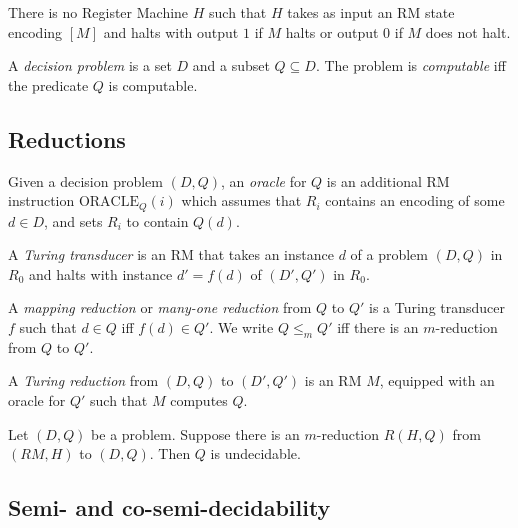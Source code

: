 \documentclass{article}
\begin{document}
\begin{theorem}[Notes I.8]
	There is no Register Machine $H$ such that $H$ takes as input an RM state encoding
	$[M]$ and halts with output $1$ if $M$ halts or output $0$ if $M$ does not halt.
\end{theorem}


\begin{definition}
	A \emph{decision problem} is a set $D$ and a subset $Q\subseteq D$.
	The problem is \emph{computable} iff the predicate $Q$ is computable.
\end{definition}

\subsection{Reductions}

\begin{definition}
	Given a decision problem $(D,Q)$, an \emph{oracle} for $Q$ is an additional
	RM instruction $\text{ORACLE}_Q(i)$ which assumes that $R_i$ contains an
	encoding of some $d\in D$, and sets $R_i$ to contain $Q(d)$.
\end{definition}

\begin{definition}
	A \emph{Turing transducer} is an RM that takes an instance $d$ of a problem $(D,Q)$
	in $R_0$ and halts with instance $d'=f(d)$ of $(D',Q')$ in $R_0$.
\end{definition}

\begin{definition}
	A \emph{mapping reduction} or \emph{many-one reduction} from $Q$ to $Q'$ is a
	Turing transducer $f$ such that $d\in Q$ iff $f(d)\in Q'$. We write $Q\leq_m Q'$
	iff there is an $m$-reduction from $Q$ to $Q'$.
\end{definition}

\begin{definition}
	A \emph{Turing reduction} from $(D,Q)$ to $(D',Q')$ is an RM $M$, equipped with
	an oracle for $Q'$ such that $M$ computes $Q$.
\end{definition}

\begin{theorem}[Notes I.15]
	Let $(D,Q)$ be a problem. Suppose there is an $m$-reduction $R(H,Q)$ from
	$(RM, H)$ to $(D,Q)$. Then $Q$ is undecidable.
\end{theorem}

\subsection{Semi- and co-semi-decidability}
\end{document}
